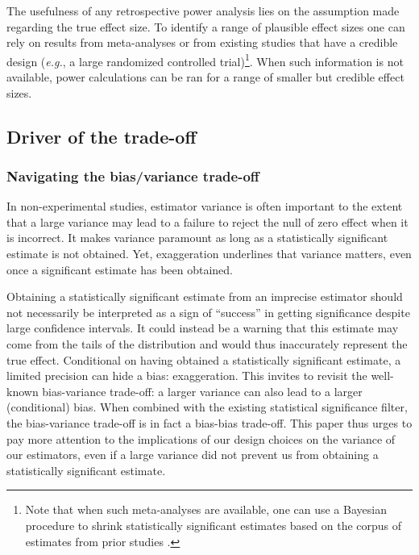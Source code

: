 \documentclass[usletter, 12pt]{article}
\begin{document}
				The usefulness of any retrospective power analysis lies on the assumption made regarding the true effect size. To identify a range of plausible effect sizes one can rely on results from meta-analyses or from existing studies that have a credible design (\textit{e.g.}, a large randomized controlled trial)\footnote{Note that when such meta-analyses are available, one can use a Bayesian procedure to shrink statistically significant estimates based on the corpus of estimates from prior studies \cite{zwet_proposal_2021, zwet_significance_2021, zwet_statistical_2021} .}. When such information is not available, power calculations can be ran for a range of smaller but credible effect sizes.
				
		\subsection{Driver of the trade-off}
		
		
			\subsubsection{Navigating the bias/variance trade-off}
			
				In non-experimental studies, estimator variance is often important to the extent that a large variance may lead to a failure to reject the null of zero effect when it is incorrect. It makes variance paramount as long as a statistically significant estimate is not obtained. Yet, exaggeration underlines that variance matters, even once a significant estimate has been obtained. 
			
				 Obtaining a statistically significant estimate from an imprecise estimator should not necessarily be interpreted as a sign of ``success'' in getting significance despite large confidence intervals. It could instead be a warning that this estimate may come from the tails of the distribution and would thus inaccurately represent the true effect. Conditional on having obtained a statistically significant estimate, a limited precision can hide a bias: exaggeration. This invites to revisit the well-known bias-variance trade-off: a larger variance can also lead to a larger (conditional) bias. When combined with the existing statistical significance filter, the bias-variance trade-off is in fact a bias-bias trade-off. This paper thus urges to pay more attention to the implications of our design choices on the variance of our estimators, even if a large variance did not prevent us from obtaining a statistically significant estimate.
			
\end{document}
